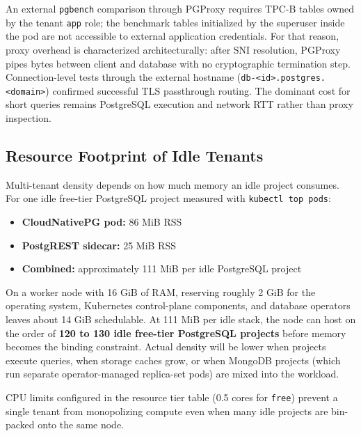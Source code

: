 An external \texttt{pgbench} comparison through PGProxy requires TPC-B tables owned by the tenant \texttt{app} role; the benchmark tables initialized by the superuser inside the pod are not accessible to external application credentials. For that reason, proxy overhead is characterized architecturally: after SNI resolution, PGProxy pipes bytes between client and database with no cryptographic termination step. Connection-level tests through the external hostname (\texttt{db-<id>.postgres.<domain>}) confirmed successful TLS passthrough routing. The dominant cost for short queries remains PostgreSQL execution and network RTT rather than proxy inspection.

\subsection{Resource Footprint of Idle Tenants}
\label{sec:resource_footprint}

Multi-tenant density depends on how much memory an idle project consumes. For one idle free-tier PostgreSQL project measured with \texttt{kubectl top pods}:

\begin{itemize}
    \item \textbf{CloudNativePG pod:} 86 MiB RSS
    \item \textbf{PostgREST sidecar:} 25 MiB RSS
    \item \textbf{Combined:} approximately 111 MiB per idle PostgreSQL project
\end{itemize}

On a worker node with 16 GiB of RAM, reserving roughly 2 GiB for the operating system, Kubernetes control-plane components, and database operators leaves about 14 GiB schedulable. At 111 MiB per idle stack, the node can host on the order of \textbf{120 to 130 idle free-tier PostgreSQL projects} before memory becomes the binding constraint. Actual density will be lower when projects execute queries, when storage caches grow, or when MongoDB projects (which run separate operator-managed replica-set pods) are mixed into the workload.

CPU limits configured in the resource tier table (0.5 cores for \texttt{free}) prevent a single tenant from monopolizing compute even when many idle projects are bin-packed onto the same node.

